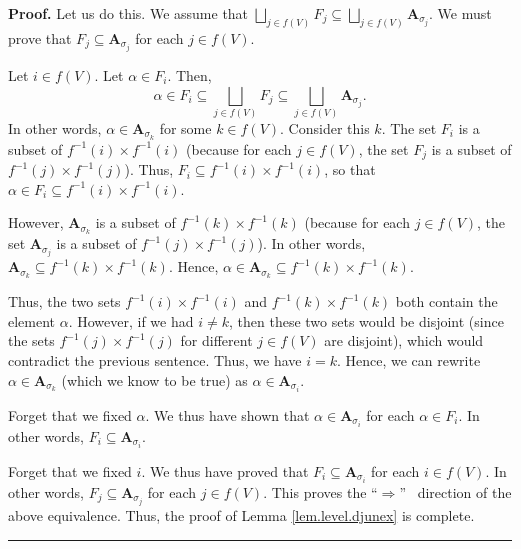 \documentclass[numbers=enddot,12pt,final,onecolumn,notitlepage]{scrartcl}%
\numberwithin{exer}{section}
\theoremstyle{definition}
\newenvironment{proof}[1][Proof]{\noindent\textbf{#1.} }{\ \rule{0.5em}{0.5em}}
\let\sqcupnonlimits\bigsqcup
\renewcommand{\bigsqcup}{\sqcupnonlimits\limits}
\newenvironment{verlong}{}{}
\begin{document}
\begin{verlong}
\begin{proof}
Let us do this. We assume that $\bigsqcup_{j\in f\left(  V\right)  }%
F_{j}\subseteq\bigsqcup_{j\in f\left(  V\right)  }\mathbf{A}_{\sigma_{j}}$. We
must prove that $F_{j}\subseteq\mathbf{A}_{\sigma_{j}}$ for each $j\in
f\left(  V\right)  $.

Let $i\in f\left(  V\right)  $. Let $\alpha\in F_{i}$. Then,%
\[
\alpha\in F_{i}\subseteq\bigsqcup_{j\in f\left(  V\right)  }F_{j}%
\subseteq\bigsqcup_{j\in f\left(  V\right)  }\mathbf{A}_{\sigma_{j}}.
\]
In other words, $\alpha\in\mathbf{A}_{\sigma_{k}}$ for some $k\in f\left(
V\right)  $. Consider this $k$. The set $F_{i}$ is a subset of $f^{-1}\left(
i\right)  \times f^{-1}\left(  i\right)  $ (because for each $j\in f\left(
V\right)  $, the set $F_{j}$ is a subset of $f^{-1}\left(  j\right)  \times
f^{-1}\left(  j\right)  $). Thus, $F_{i}\subseteq f^{-1}\left(  i\right)
\times f^{-1}\left(  i\right)  $, so that $\alpha\in F_{i}\subseteq
f^{-1}\left(  i\right)  \times f^{-1}\left(  i\right)  $.

However, $\mathbf{A}_{\sigma_{k}}$ is a subset of $f^{-1}\left(  k\right)
\times f^{-1}\left(  k\right)  $ (because for each $j\in f\left(  V\right)  $,
the set $\mathbf{A}_{\sigma_{j}}$ is a subset of $f^{-1}\left(  j\right)
\times f^{-1}\left(  j\right)  $). In other words, $\mathbf{A}_{\sigma_{k}%
}\subseteq f^{-1}\left(  k\right)  \times f^{-1}\left(  k\right)  $. Hence,
$\alpha\in\mathbf{A}_{\sigma_{k}}\subseteq f^{-1}\left(  k\right)  \times
f^{-1}\left(  k\right)  $.

Thus, the two sets $f^{-1}\left(  i\right)  \times f^{-1}\left(  i\right)  $
and $f^{-1}\left(  k\right)  \times f^{-1}\left(  k\right)  $ both contain the
element $\alpha$. However, if we had $i\neq k$, then these two sets would be
disjoint (since the sets $f^{-1}\left(  j\right)  \times f^{-1}\left(
j\right)  $ for different $j\in f\left(  V\right)  $ are disjoint), which
would contradict the previous sentence. Thus, we have $i=k$. Hence, we can
rewrite $\alpha\in\mathbf{A}_{\sigma_{k}}$ (which we know to be true) as
$\alpha\in\mathbf{A}_{\sigma_{i}}$.

Forget that we fixed $\alpha$. We thus have shown that $\alpha\in
\mathbf{A}_{\sigma_{i}}$ for each $\alpha\in F_{i}$. In other words,
$F_{i}\subseteq\mathbf{A}_{\sigma_{i}}$.

Forget that we fixed $i$. We thus have proved that $F_{i}\subseteq
\mathbf{A}_{\sigma_{i}}$ for each $i\in f\left(  V\right)  $. In other words,
$F_{j}\subseteq\mathbf{A}_{\sigma_{j}}$ for each $j\in f\left(  V\right)  $.
This proves the \textquotedblleft$\Longrightarrow$\textquotedblright%
\ direction of the above equivalence. Thus, the proof of Lemma
\ref{lem.level.djunex} is complete.
\end{proof}
\end{verlong}
\end{document}
